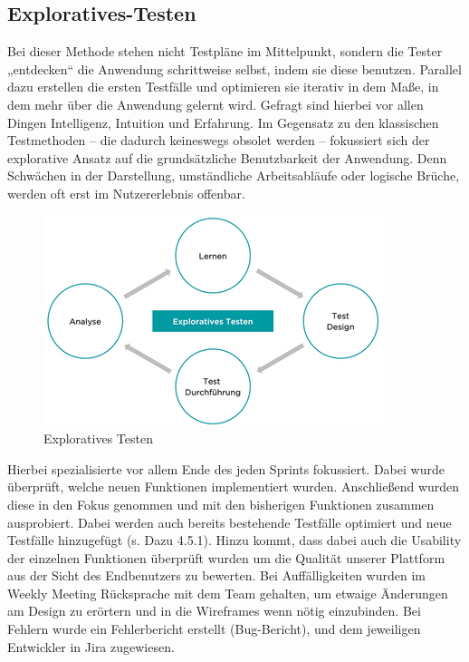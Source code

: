 \subsection{Exploratives-Testen}
\label{sub:UmsetzungTestExplorativ}

Bei dieser Methode stehen nicht Testpläne im Mittelpunkt, sondern die Tester „entdecken“ die Anwendung schrittweise selbst, indem sie diese benutzen. Parallel dazu erstellen die ersten Testfälle und optimieren sie iterativ in dem Maße, in dem mehr über die Anwendung gelernt wird. Gefragt sind hierbei vor allen Dingen Intelligenz, Intuition und Erfahrung. Im Gegensatz zu den klassischen Testmethoden – die dadurch keineswegs obsolet werden – fokussiert sich der explorative Ansatz auf die grundsätzliche Benutzbarkeit der Anwendung. Denn Schwächen in der Darstellung, umständliche Arbeitsabläufe oder logische Brüche, werden oft erst im Nutzererlebnis offenbar.

\begin{figure}[!htb]
  \centering
  \includegraphics[width=.9\textwidth]{figures/rebecca/Exploratives_Testen.png}
  \caption[]{Exploratives Testen}
  \label{fig:explorativesTesten}
\end{figure}

Hierbei spezialisierte vor allem Ende des jeden Sprints fokussiert. Dabei wurde überprüft, welche neuen Funktionen implementiert wurden. Anschließend wurden diese in den Fokus genommen und mit den bisherigen Funktionen zusammen ausprobiert. Dabei werden auch bereits bestehende Testfälle optimiert und neue Testfälle hinzugefügt (s. Dazu 4.5.1). Hinzu kommt, dass dabei auch die Usability der einzelnen Funktionen überprüft wurden um die Qualität unserer Plattform aus der Sicht des Endbenutzers zu bewerten.
Bei Auffälligkeiten wurden im Weekly Meeting Rücksprache mit dem Team gehalten, um etwaige Änderungen am Design zu erörtern und in die Wireframes wenn nötig einzubinden.
Bei Fehlern wurde ein Fehlerbericht erstellt (Bug-Bericht), und dem jeweiligen Entwickler in Jira zugewiesen.